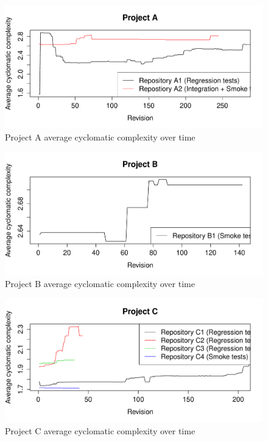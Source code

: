 \begin{figure}[H]
    \centering
    \includegraphics[width=\textwidth,keepaspectratio]{figure/results/rq1/project_a_avg_complexity.pdf}
    \caption{Project A average cyclomatic complexity over time}
    \label{fig:project_a_avg_complexity}
\end{figure}

\begin{figure}[H]
    \centering
    \includegraphics[width=\textwidth,keepaspectratio]{figure/results/rq1/project_b_avg_complexity.pdf}
    \caption{Project B average cyclomatic complexity over time}
    \label{fig:project_b_avg_complexity}
\end{figure}

\begin{figure}[H]
    \centering
    \includegraphics[width=\textwidth,keepaspectratio]{figure/results/rq1/project_c_avg_complexity.pdf}
    \caption{Project C average cyclomatic complexity over time}
    \label{fig:project_c_avg_complexity}
\end{figure}

